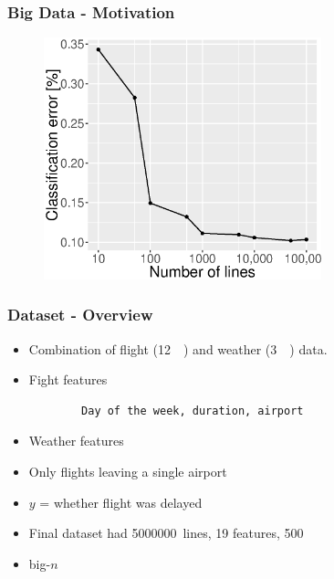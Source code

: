 \documentclass[11pt, compress]{beamer}
\begin{document}
\begin{frame}[fragile]
  \frametitle{Big Data - Motivation}
\begin{figure}[ht]
  \centering
  \includegraphics[height=7cm]{rf_error.eps}
\end{figure}
\end{frame}

\begin{frame}[fragile]
  \frametitle{Dataset - Overview}

  \begin{itemize}
    \item Combination of flight (\SI{12}{\giga\byte}) and weather (\SI{3}{\giga\byte}) data.
    \item Fight features
    \begin{verbatim}
        Day of the week, duration, airport
    \end{verbatim}
    \item Weather features
    \item Only flights leaving a single airport
    \item $y$ = whether flight was delayed
    \item Final dataset had \SI{5000000}{lines}, 19 features, \SI{500}{\mega\byte}
    \item big-$n$
\end{itemize}
\end{frame}
\end{document}
